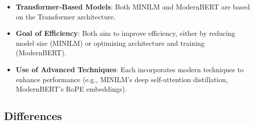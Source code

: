 \documentclass{article}
\begin{document}
\begin{itemize}  
    \item \textbf{Transformer-Based Models}: Both MINILM and ModernBERT are based on the Transformer architecture.  
    \item \textbf{Goal of Efficiency}: Both aim to improve efficiency, either by reducing model size (MINILM) or optimizing architecture and training (ModernBERT).  
    \item \textbf{Use of Advanced Techniques}: Each incorporates modern techniques to enhance performance (e.g., MINILM's deep self-attention distillation, ModernBERT's RoPE embeddings).  
\end{itemize}  
  
\subsection{Differences}  
  
\end{document}
